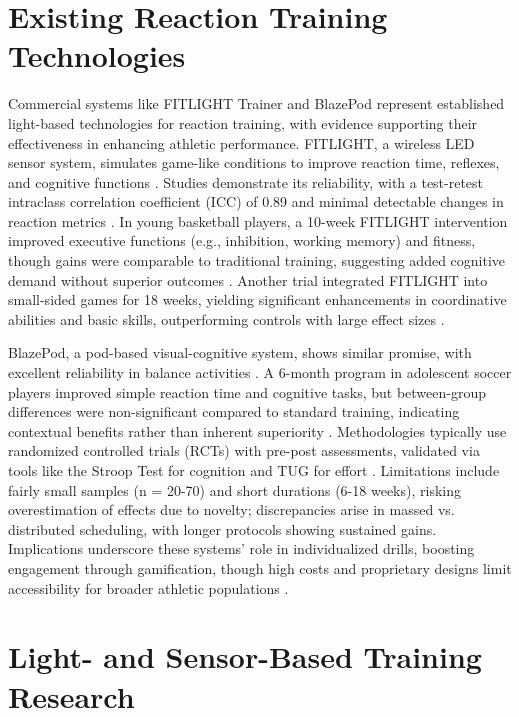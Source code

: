 \section{Existing Reaction Training Technologies}

	Commercial systems like FITLIGHT Trainer and BlazePod represent established light-based technologies for reaction training, with evidence supporting their effectiveness in enhancing athletic performance. FITLIGHT, a wireless LED sensor system, simulates game-like conditions to improve reaction time, reflexes, and cognitive functions \parencite{Hassan:2025:FTI}. Studies demonstrate its reliability, with a test-retest intraclass correlation coefficient (ICC) of 0.89 and minimal detectable changes in reaction metrics \parencite{Myers:2021:TRR}. In young basketball players, a 10-week FITLIGHT intervention improved executive functions (e.g., inhibition, working memory) and fitness, though gains were comparable to traditional training, suggesting added cognitive demand without superior outcomes \parencite{Hassan:2025:FTI}. Another trial integrated FITLIGHT into small-sided games for 18 weeks, yielding significant enhancements in coordinative abilities and basic skills, outperforming controls with large effect sizes \parencite{Steff:2024:IAR}.
	
	BlazePod, a pod-based visual-cognitive system, shows similar promise, with excellent reliability in balance activities \parencite{Cekok:2025:EBV}. A 6-month program in adolescent soccer players improved simple reaction time and cognitive tasks, but between-group differences were non-significant compared to standard training, indicating contextual benefits rather than inherent superiority \parencite{Theofilou:2022:EVS}. Methodologies typically use randomized controlled trials (RCTs) with pre-post assessments, validated via tools like the Stroop Test for cognition and TUG for effort \parencite{Cekok:2025:EBV}. Limitations include fairly small samples (n = 20-70) and short durations (6-18 weeks), risking overestimation of effects due to novelty; discrepancies arise in massed vs. distributed scheduling, with longer protocols showing sustained gains. Implications underscore these systems' role in individualized drills, boosting engagement through gamification, though high costs and proprietary designs limit accessibility for broader athletic populations \parencite{Hassan:2025:FTI}.


\section{Light- and Sensor-Based Training Research}

